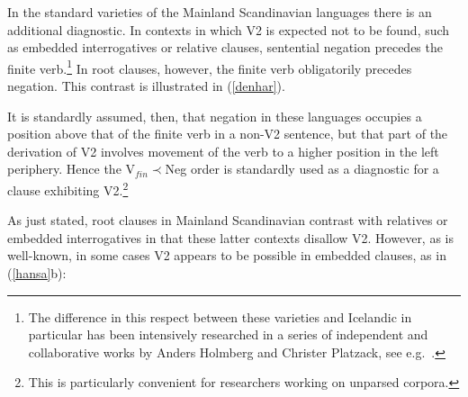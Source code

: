 \documentclass[output=paper]{LSP/langsci}
\begin{document}
In the standard varieties of the Mainland Scandinavian languages there is an additional diagnostic. In contexts in which V2 is expected not to be found, such as embedded interrogatives or relative clauses, sentential negation precedes the finite verb.\footnote{The difference in this respect between these varieties and Icelandic in particular has been intensively researched in a series of independent and collaborative works by Anders Holmberg and Christer Platzack, see e.g.\ \cite{platzack87,platzack-holmberg89,holmberg-platzack91,holmberg-platzack95,holmberg10}.}   In root clauses, however, the finite verb obligatorily precedes negation. This contrast is illustrated in (\ref{denhar}). 

\begin{exe}
\ex \label{denhar}
\begin{xlist}
\end{xlist}
\end{exe}
It is standardly assumed, then, that negation in these languages occupies a position above that of the finite verb in a non-V2 sentence, but that part of the derivation of V2 involves movement of the verb to a higher position in the left periphery.  Hence the V$_{fin}$$\prec$Neg order is standardly used as a diagnostic for a clause exhibiting V2.\footnote{This is particularly convenient for researchers working on unparsed corpora.}

As just stated, root clauses in Mainland Scandinavian contrast with relatives or embedded interrogatives in that these latter contexts disallow V2. However, as is well-known, in some cases V2 appears to be possible in embedded clauses, as in (\ref{hansa}b):
\end{document}
